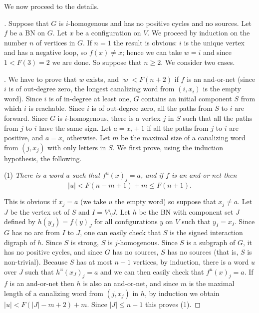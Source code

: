 \documentclass[11pt,letter]{article}
\newcommand{\BF}[1]{{{\boldmath{\bf #1}\unboldmath}}}
\begin{document}
\medskip
We now proceed to the details. 


\begin{proof}[\BF{Proof of Lemmas~\ref{lem:no_fixed_vertex} and \ref{lem:no_fixed_vertex_2}}]
Suppose that $G$ is $i$-homogenous and has no positive cycles and no sources. Let $f$ be a BN on $G$. Let $x$ be a configuration on $V$. We proceed by induction on the number $n$ of vertices in $G$. If $n=1$ the result is obvious: $i$ is the unique vertex and has a negative loop, so $f(x)\neq x$; hence we can take $w=i$ and since $1<F(3)=2$ we are done. So suppose that $n\geq 2$. We consider two cases. 

\bigskip
\BF{Case 1: $i$ is of out-degree zero}. We have to prove that $w$ exists, and $|w|< F(n+2)$ if $f$ is an and-or-net (since $i$ is of out-degree zero, the longest canalizing word from $(i,x_i)$ is the empty word). Since $i$ is of in-degree at least one, $G$ contains an initial component $S$ from which $i$ is reachable. Since $i$ is of out-degree zero, all the paths from $S$ to $i$ are forward. Since $G$ is $i$-homogenous, there is a vertex $j$ in $S$ such that all the paths from $j$ to $i$ have the same sign. Let $a=x_i+1$ if all the paths from $j$ to $i$ are positive, and $a=x_i$ otherwise. Let $m$ be the maximal size of a canalizing word from $(j,x_j)$ with only letters in $S$. We first prove, using the induction hypothesis, the following.

\bigskip
\noindent
(1) {\em There is a word $u$ such that $f^u(x)_j=a$, and if $f$ is an and-or-net then}
\[
|u|< F(n-m+1)+m\leq F(n+1).
\]

\medskip
\noindent
This is obvious if $x_j=a$ (we take $u$ the empty word) so suppose that $x_j\neq a$. Let $J$ be the vertex set of $S$ and $I=V\setminus J$. Let $h$ be the BN with component set $J$ defined by $h(y_J)=f(y)_J$ for all configurations $y$ on $V$ such that $y_I=x_I$. Since $G$ has no arc from $I$ to $J$, one can easily check that $S$ is the signed interaction digraph of $h$. Since $S$ is strong, $S$ is $j$-homogenous. Since $S$ is a subgraph of $G$, it has no positive cycles, and since $G$ has no sources, $S$ has no sources (that is, $S$ is non-trivial). Because $S$ has at most $n-1$ vertices, by induction, there is a word $u$ over $J$ such that $h^u(x_J)_j=a$ and we can then easily check that $f^u(x)_j=a$. If $f$ is an and-or-net then $h$ is also an and-or-net, and since $m$ is the maximal length of a canalizing word from $(j,x_j)$ in $h$, by induction we obtain $|u|< F(|J|-m+2)+m$. Since $|J|\leq n-1$ this proves (1).


\end{proof}
\end{document}

